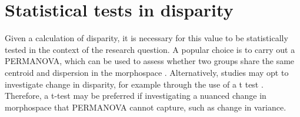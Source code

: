 \documentclass[titlepage]{article}
\begin{document}



\section{Statistical tests in disparity}
Given a calculation of disparity, it is necessary for this value to be statistically tested in the context of the research question.
A popular choice is to carry out a PERMANOVA, which can be used to assess whether two groups share the same centroid and dispersion in the morphospace \citep{moon2020early,apaldetti2021sauropodomorph,donati2025continuity}.
Alternatively, studies may opt to investigate change in disparity, for example through the use of a t test \citep{patton2021adaptive,haug2023quantitative,wang2023low}.
Therefore, a t-test may be preferred if investigating a nuanced change in morphospace that PERMANOVA cannot capture, such as change in variance.
\end{document}
